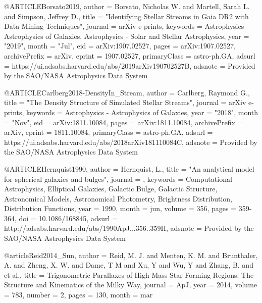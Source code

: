 \documentclass[apj]{emulateapj}
\begin{document}
{{@ARTICLE{Borsato2019,
       author = {{Borsato}, Nicholas W. and {Martell}, Sarah L. and {Simpson}, Jeffrey D.},
        title = "{Identifying Stellar Streams in Gaia DR2 with Data Mining Techniques}",
      journal = {arXiv e-prints},
     keywords = {Astrophysics - Astrophysics of Galaxies, Astrophysics - Solar and Stellar Astrophysics},
         year = "2019",
        month = "Jul",
          eid = {arXiv:1907.02527},
        pages = {arXiv:1907.02527},
archivePrefix = {arXiv},
       eprint = {1907.02527},
 primaryClass = {astro-ph.GA},
       adsurl = {https://ui.adsabs.harvard.edu/abs/2019arXiv190702527B},
      adsnote = {Provided by the SAO/NASA Astrophysics Data System}
}



@ARTICLE{Carlberg2018-DensityIn_Stream,
       author = {{Carlberg}, Raymond G.},
        title = "{The Density Structure of Simulated Stellar Streams}",
      journal = {arXiv e-prints},
     keywords = {Astrophysics - Astrophysics of Galaxies},
         year = "2018",
        month = "Nov",
          eid = {arXiv:1811.10084},
        pages = {arXiv:1811.10084},
archivePrefix = {arXiv},
       eprint = {1811.10084},
 primaryClass = {astro-ph.GA},
       adsurl = {https://ui.adsabs.harvard.edu/abs/2018arXiv181110084C},
      adsnote = {Provided by the SAO/NASA Astrophysics Data System}
}


@ARTICLE{Hernquist1990,
   author = {{Hernquist}, L.},
    title = "{An analytical model for spherical galaxies and bulges}",
  journal = {\apj},
 keywords = {Computational Astrophysics, Elliptical Galaxies, Galactic Bulge, Galactic Structure, Astronomical Models, Astronomical Photometry, Brightness Distribution, Distribution Functions},
     year = 1990,
    month = jun,
   volume = 356,
    pages = {359-364},
      doi = {10.1086/168845},
   adsurl = {http://adsabs.harvard.edu/abs/1990ApJ...356..359H},
  adsnote = {Provided by the SAO/NASA Astrophysics Data System}
}



@article{Reid2014_Sun,
   author          = {Reid, M. J. and Menten, K. M. and Brunthaler, A. and Zheng, X. W. and Dame, T M and Xu, Y and Wu, Y and Zhang, B. and {et al.}},
   title           = {{Trigonometric Parallaxes of High Mass Star Forming Regions: The Structure and Kinematics of the Milky Way}},
   journal         = {ApJ},
   year            = {2014},
   volume          = {783},
   number          = {2},
   pages           = {130},
   month           = mar
}




}}
\end{document}
